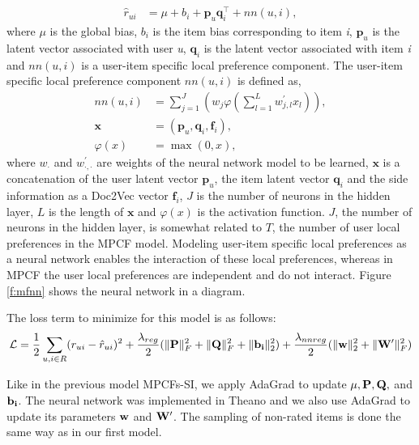 \begin{align}
	\hat{r}_{ui} &= \mu + b_i + \textbf{p}_u \textbf{q}_i^\intercal + nn(u, i),
\end{align}
where $\mu$ is the global bias, $b_i$ is the item bias corresponding to item \textit{i}, $\textbf{p}_u$ is the latent vector associated with user \textit{u}, $\textbf{q}_i$ is the latent vector associated with item \textit{i} and $nn(u, i)$ is a user-item specific local preference component.
The user-item specific local preference component $nn(u, i)$ is defined as,
\begin{align}
	nn(u, i) &= \sum_{j=1}^{J} (w_{j} \varphi(\sum_{l=1}^{L} w^\prime_{j,l} x_l)),\\
	\mathbf{x} &= (\mathbf{p}_u, \mathbf{q}_i, \mathbf{f}_i), \\
	\varphi(x) &= \max(0, x),
\end{align}
where $w_{\cdot}$ and $w_{\cdot,\cdot}^\prime$ are weights of the neural network model to be learned, $\mathbf{x}$ is a concatenation of the user latent vector $\mathbf{p}_u$, the item latent vector $\mathbf{q}_i$ and the side information as a Doc2Vec vector $\mathbf{f}_i$, $J$ is the number of neurons in the hidden layer, $L$ is the length of $\mathbf{x}$ and $\varphi(x)$ is the activation function.
$J$, the number of neurons in the hidden layer, is somewhat related to $T$, the number of user local preferences in the MPCF model.
Modeling user-item specific local preferences as a neural network enables the interaction of these local preferences, whereas in MPCF the user local preferences are independent and do not interact.
Figure \ref{f:mfnn} shows the neural network in a diagram.

The loss term to minimize for this model is as follows:
\begin{equation}
\begin{aligned}
\mathcal{L} &= \frac{1}{2} \sum_{u,i \in R} (r_{ui} - \hat{r}_{ui})^2 + \frac{\lambda_{reg}}{2} (\lVert{\ensuremath{\mathbf{P}}}\rVert_F^2 + \lVert{\ensuremath{\mathbf{Q}}}\rVert_F^2 + \lVert{\ensuremath{\mathbf{b_i}}}\rVert_2^2) + \frac{\lambda_{nn reg}}{2}(\lVert{\ensuremath{\mathbf{w}}}\rVert_2^2 + \lVert{\ensuremath{\mathbf{W^\prime}}}\rVert_F^2)\\
\end{aligned}
\end{equation}

Like in the previous model MPCFs-SI, we apply AdaGrad to update $\mu, \mathbf{P}, \mathbf{Q},$ and $\mathbf{b_i}$.
The neural network was implemented in Theano and we also use AdaGrad to update its parameters $\mathbf{w}$ and  $\mathbf{W^\prime}$.
The sampling of non-rated items is done the same way as in our first model.

